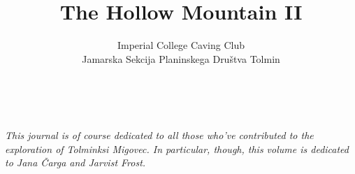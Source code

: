 \documentclass[symmetric, a4paper]{tufte-book} %
\title{The Hollow Mountain II}
\author{Imperial College Caving Club \\ Jamarska Sekcija Planinskega Dru\v{s}tva Tolmin }
\begin{document}
\frontmatter 
\maketitle %
\justify

\cleardoublepage
~\vfill
\begin{doublespace}
\noindent\fontsize{12}{14}\selectfont\sffamily\slshape
\nohyphenation
This journal is of course dedicated to all those who've contributed to the exploration of Tolminksi Migovec. In particular, though, this volume is dedicated to Jana Čarga and Jarvist Frost.
%
\end{doublespace}
\vfill
\vfill


\newpage


\tableofcontents 


\mainmatter
%
%
%
%
%



%
%
%
%
%

\backmatter
% 	
%         	
% 	
	
	
	\listofsurveys

    \passage[|see{}]{}
    \printindex
   	
    

    
\end{document}
